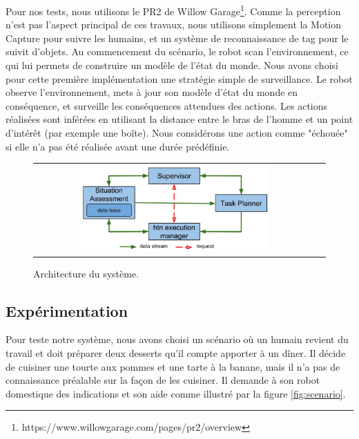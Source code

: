 \documentclass[a4paper,11pt,twoside]{StyleThese}
\begin{document}
Pour nos tests, nous utilisons le PR2 de Willow Garage\footnote{https://www.willowgarage.com/pages/pr2/overview}. Comme la perception n'est pas l'aspect principal de ces travaux, nous utilisons simplement la Motion Capture pour suivre les humains, et un système de reconnaissance de tag pour le suivit d'objets.
Au commencement du scénario, le robot scan l'environnement, ce qui lui permets de construire un modèle de l'état du monde.
Nous avons choisi pour cette première implémentation une stratégie simple de surveillance. Le robot observe l'environnement, mets à jour son modèle d'état du monde en conséquence, et surveille les conséquences attendues des actions. Les actions réalisées sont inférées en utilisant la distance entre le bras de l'homme et un point d'intérêt (par exemple une boîte). Nous considérons une action comme "échouée" si elle n'a pas été réalisée avant une durée prédéfinie.

%
%
%
\begin{figure}[ht!]

 \centering
 \begin{tabular}{cc}
  \includegraphics[width=0.69\textwidth]{img/archi.jpg}
 \end{tabular}
 \caption{Architecture du système.}
 \label{fig:architecture}
 \end{figure}
 
 \subsection{Expérimentation}
 \label{sec:experiment}
Pour teste notre système, nous avons choisi un scénario où un humain revient du travail et doit préparer deux desserts qu'il compte apporter à un dîner. Il décide de cuisiner une tourte aux pommes et une tarte à la banane, mais il n'a pas de connaissance préalable sur la façon de les cuisiner. Il demande à son robot domestique des indications et son aide comme illustré par la figure \ref{fig:scenario}.
\end{document}
